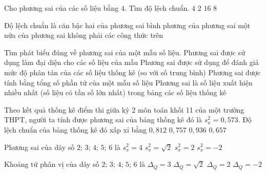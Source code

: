 \begin{ex}%
	Cho phương sai của các số liệu bằng $4$. Tìm độ lệch chuẩn.
	\choice
	{$4$}
	{\True $2$}
	{$16$}
	{$8$}
\end{ex}	

\begin{ex}%
	Độ lệch chuẩn là
	\choice
	{\True căn bậc hai của phương sai}
	{bình phương của phương sai}
	{một nửa của phương sai}
	{không phải các công thức trên}
\end{ex}	

\begin{ex}%
	Tìm phát biểu đúng về phương sai của một mẫu số liệu.
	\choice
	{Phương sai được sử dụng làm đại diện cho các số liệu của mẫu}
	{\True Phương sai được sử dụng để đánh giá mức độ phân tán của các số liệu thống kê (so với số trung bình)}
	{Phương sai được tính bằng tổng số phần tử của một mẫu số liệu}
	{Phương sai là số liệu xuất hiện nhiều nhất (số liệu có tần số lớn nhất) trong bảng các số
		liệu thống kê}
\end{ex}	

\begin{ex}%
	Theo kết quả thống kê điểm thi giữa kỳ 2 môn toán khối 11 của một trường THPT, người ta tính được phương sai của bảng thống kê đó là $s_x^2=0{,}573$. Độ lệch chuẩn của bảng thống kê đó xấp xỉ bằng
	\choice
	{$0{,}812$}
	{\True $0{,}757$}
	{$0{,}936$}
	{$0{,}657$}
\end{ex}	

\begin{ex}%
	Phương sai của dãy số $2$; $3$; $4$; $5$; $6$ là
	\choice
	{$s_x^2=4$}
	{$s_x^2=\sqrt{2}$}
	{\True $s_x^2=2$}
	{$s_x^2=-2$}
\end{ex}

\begin{ex}%
	Khoảng tứ phân vị của dãy số $2$; $3$; $4$; $5$; $6$ là
	\choice
	{\True $\Delta_Q=3$}
	{$\Delta_Q=\sqrt{2}$}
	{$\Delta_Q=2$}
	{$\Delta_Q=-2$}
\end{ex}	

